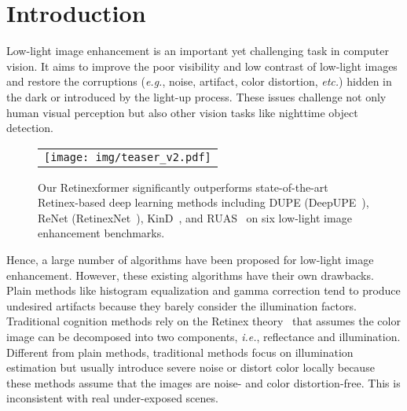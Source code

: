 \documentclass[10pt,twocolumn,letterpaper]{article}
\begin{document}
\vspace{-3mm}
\section{Introduction}
\vspace{-1mm}
Low-light image enhancement is an important yet challenging task in computer vision. It aims to improve the poor visibility and low contrast of low-light images and restore the corruptions (\emph{e.g.}, noise, artifact, color distortion, \emph{etc.}) hidden in the dark or introduced by the light-up process. These issues challenge not only human visual perception but also other vision tasks like nighttime object detection.

\begin{figure}[htp]
	\begin{center}
		\begin{tabular}[t]{c} \hspace{-5.8mm} 
			\texttt{[image: img/teaser\_v2.pdf]}
		\end{tabular}
	\end{center}
	\vspace{-2mm}
	\caption{\small Our Retinexformer significantly outperforms state-of-the-art Retinex-based deep learning methods including DUPE (DeepUPE~\cite{deep_upe}), ReNet (RetinexNet~\cite{retinex_net}), KinD~\cite{kind}, and  RUAS~\cite{ruas} on six  low-light image enhancement benchmarks.}
	\label{fig:teaser}
	\vspace{-3mm}
\end{figure}

Hence, a large number of algorithms have been proposed for low-light image enhancement. However, these existing algorithms have their own drawbacks. Plain methods like histogram equalization and gamma correction tend to produce undesired artifacts because they barely consider the  illumination factors. Traditional cognition methods rely on the Retinex theory~\cite{retinex} that assumes the color image can be decomposed into two components, \emph{i.e.}, reflectance  and illumination. Different from plain methods, traditional methods  focus on illumination estimation but usually introduce severe noise or distort color locally because these methods assume that the images are noise- and color distortion-free. This is inconsistent with real under-exposed scenes. 
\end{document}
